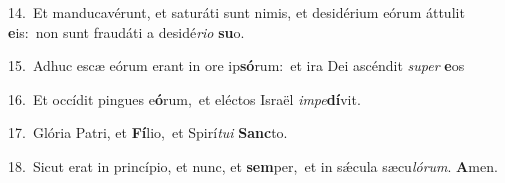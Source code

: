 {\numbfont\textcolor{\numbcolor}{14.}}~Et manducavérunt, et saturáti sunt nimis, et desidérium eórum áttulit \textbf{e}\-is:~\star non sunt fraudáti a desidé\-\textit{ri}\-\textit{o} \textbf{su}\-o.\par
{\numbfont\textcolor{\numbcolor}{15.}}~Adhuc escæ eórum erant in ore ip\-\textbf{só}\-rum:~\star et ira Dei ascéndit \textit{su}\-\textit{per} \textbf{e}\-os\par
{\numbfont\textcolor{\numbcolor}{16.}}~Et occídit pingues e\-\textbf{ó}\-rum,~\star et eléctos Israël \textit{im}\-\textit{pe}\textbf{dí}vit.\par
{\numbfont\textcolor{\numbcolor}{17.}}~Glória Patri, et \textbf{Fí}\-lio,~\star et Spirí\-\textit{tu}\-\textit{i} \textbf{Sanc}\-to.\par
{\numbfont\textcolor{\numbcolor}{18.}}~Sicut erat in princípio, et nunc, et \textbf{sem}\-per,~\star et in sǽcula sæcu\-\textit{ló}\-\textit{rum}. \textbf{A}\-men.\par
